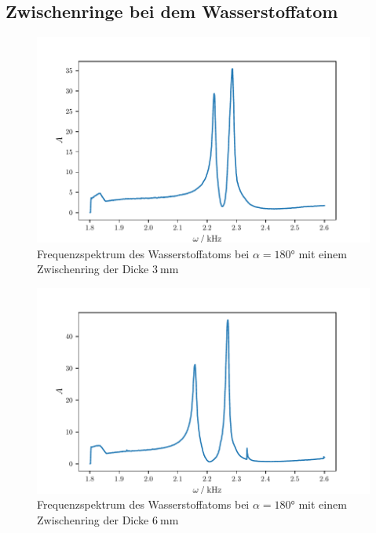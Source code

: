 \subsection{Zwischenringe bei dem Wasserstoffatom}
\begin{figure}
    \centering
    \includegraphics{build/h3ring.pdf}
    \caption{Frequenzspektrum des Wasserstoffatoms bei $\alpha = \ang{180}$ mit einem Zwischenring der Dicke $\qty{3}{\milli\meter}$}
    \label{pic:h3ring}
\end{figure}
\begin{figure}
    \centering
    \includegraphics{build/h6ring.pdf}
    \caption{Frequenzspektrum des Wasserstoffatoms bei $\alpha = \ang{180}$ mit einem Zwischenring der Dicke $\qty{6}{\milli\meter}$}
    \label{pic:h6ring}
\end{figure}
